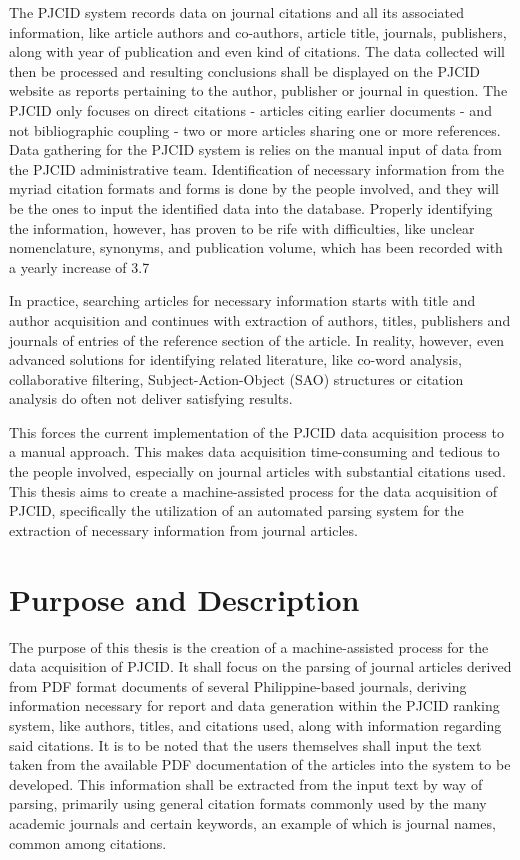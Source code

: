 The PJCID system records data on journal citations and all its associated information, like article authors and co-authors, article title, journals, publishers, along with year of publication and even kind of citations. The data collected will then be processed and resulting conclusions shall be displayed on the PJCID website as reports pertaining to the author, publisher or journal in question. The PJCID only focuses on direct citations -   articles citing earlier documents - and not bibliographic coupling - two or more articles sharing one or more references. \cite{citation}  
Data gathering for the PJCID system is relies on the manual input of data from the PJCID administrative team. Identification of necessary information from the myriad citation formats and forms is done by the people involved, and they will be the ones to input the identified data into the database. Properly identifying the information, however, has proven to be rife with difficulties, like unclear nomenclature, synonyms, and publication volume, which has been recorded with a yearly increase of 3.7%

In practice, searching articles for necessary information starts with title and author acquisition and continues with extraction of authors, titles, publishers and journals of entries of the reference section of the article. In reality, however, even advanced solutions for identifying related literature, like co-word analysis, collaborative filtering, Subject-Action-Object (SAO) structures or citation analysis do often not deliver satisfying results. \cite{sols} 

This forces the current implementation of the PJCID data acquisition process to a manual approach. This makes data acquisition time-consuming and tedious to the people involved, especially on journal articles with substantial citations used. This thesis aims to create a machine-assisted process for the data acquisition of PJCID, specifically the utilization of an automated parsing system for the extraction of necessary information from journal articles.

\section{Purpose and Description}
The purpose of this thesis is the creation of a machine-assisted process for the data acquisition of PJCID. It shall focus on the parsing of journal articles derived from PDF format documents of several Philippine-based journals, deriving information necessary for report and data generation within the PJCID ranking system, like authors, titles, and citations used, along with information regarding said citations. It is to be noted that the users themselves shall input the text taken from the available PDF documentation of the articles into the system to be developed.
This information shall be extracted from the input text by way of parsing, primarily using general citation formats commonly used by the many academic journals and certain keywords, an example of which is journal names, common among citations. 

